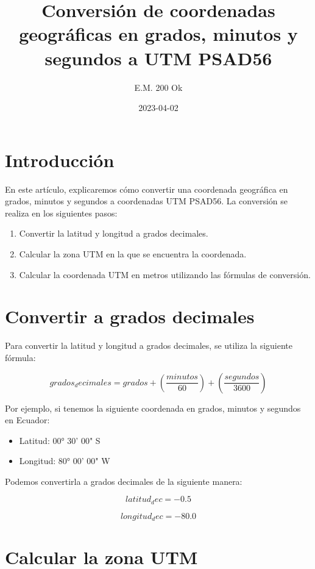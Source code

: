 \documentclass{article}
\title{Conversión de coordenadas geográficas en grados, minutos y segundos a UTM PSAD56}
\author{E.M. 200 Ok}
\date{2023-04-02}
\begin{document}
\maketitle

\section{Introducción}

En este artículo, explicaremos cómo convertir una coordenada geográfica en grados, minutos y segundos a coordenadas UTM PSAD56. La conversión se realiza en los siguientes pasos:

\begin{enumerate}
\item Convertir la latitud y longitud a grados decimales.
\item Calcular la zona UTM en la que se encuentra la coordenada.
\item Calcular la coordenada UTM en metros utilizando las fórmulas de conversión.
\end{enumerate}

\section{Convertir a grados decimales}

Para convertir la latitud y longitud a grados decimales, se utiliza la siguiente fórmula:

\begin{equation}
grados_decimales = grados + (\frac{minutos}{60}) + (\frac{segundos}{3600})
\end{equation}

Por ejemplo, si tenemos la siguiente coordenada en grados, minutos y segundos en Ecuador:
\begin{itemize}
\item Latitud: 00° 30' 00" S
\item Longitud: 80° 00' 00" W
\end{itemize}

Podemos convertirla a grados decimales de la siguiente manera:

\begin{equation}
latitud_dec = -0.5
\end{equation}

\begin{equation}
longitud_dec = -80.0
\end{equation}

\section{Calcular la zona UTM}
\end{document}
